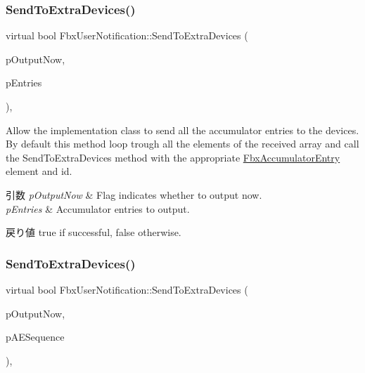 \subsubsection{\texorpdfstring{Send\+To\+Extra\+Devices()}{SendToExtraDevices()}\hspace{0.1cm}{\footnotesize\ttfamily [1/3]}}
{\footnotesize\ttfamily virtual bool Fbx\+User\+Notification\+::\+Send\+To\+Extra\+Devices (\begin{DoxyParamCaption}\item[{bool}]{p\+Output\+Now,  }\item[{\hyperlink{class_fbx_array}{Fbx\+Array}$<$ \hyperlink{class_fbx_accumulator_entry}{Fbx\+Accumulator\+Entry} $\ast$$>$ \&}]{p\+Entries }\end{DoxyParamCaption})\hspace{0.3cm}{\ttfamily [protected]}, {\ttfamily [virtual]}}

Allow the implementation class to send all the accumulator entries to the devices. By default this method loop trough all the elements of the received array and call the Send\+To\+Extra\+Devices method with the appropriate \hyperlink{class_fbx_accumulator_entry}{Fbx\+Accumulator\+Entry} element and id. 
\begin{DoxyParams}{引数}
{\em p\+Output\+Now} & Flag indicates whether to output now. \\
\hline
{\em p\+Entries} & Accumulator entries to output. \\
\hline
\end{DoxyParams}
\begin{DoxyReturn}{戻り値}
{\ttfamily true} if successful, {\ttfamily false} otherwise. 
\end{DoxyReturn}
\mbox{\label{class_fbx_user_notification_a12d7a9462d6f95d1fa8f6f6673595fb7}} 
\subsubsection{\texorpdfstring{Send\+To\+Extra\+Devices()}{SendToExtraDevices()}\hspace{0.1cm}{\footnotesize\ttfamily [2/3]}}
{\footnotesize\ttfamily virtual bool Fbx\+User\+Notification\+::\+Send\+To\+Extra\+Devices (\begin{DoxyParamCaption}\item[{bool}]{p\+Output\+Now,  }\item[{\hyperlink{class_fbx_array}{Fbx\+Array}$<$ \hyperlink{class_fbx_user_notification_1_1_a_e_sequence}{A\+E\+Sequence} $\ast$$>$ \&}]{p\+A\+E\+Sequence }\end{DoxyParamCaption})\hspace{0.3cm}{\ttfamily [protected]}, {\ttfamily [virtual]}}

